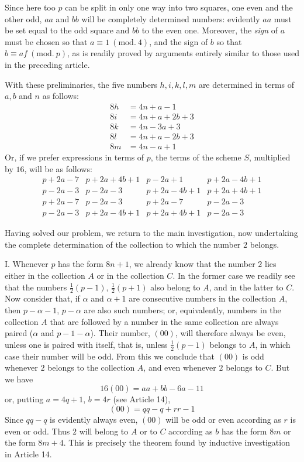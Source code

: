 Since here too $p$ can be split in only one way into two squares, one even and the other odd, $aa$ and $bb$ will be completely determined numbers: evidently $aa$ must be set equal to the odd square and $bb$ to the even one. Moreover, the \emph{sign} of $a$ must be chosen so that $a\equiv1\ (\mathrm{mod.}\ 4)$, and the sign of $b$ so that $b\equiv af\ (\mathrm{mod.}\ p)$, as is readily proved by arguments entirely similar to those used in the preceding article.

With these preliminaries, the five numbers $h,i,k,l,m$ are determined in terms of $a,b$ and $n$ as follows:
\[
\begin{aligned}
8h&=4n+a-1\\
8i&=4n+a+2b+3\\
8k&=4n-3a+3\\
8l&=4n+a-2b+3\\
8m&=4n-a+1
\end{aligned}
\]
Or, if we prefer expressions in terms of $p$, the terms of the scheme $S$, multiplied by $16$, will be as follows:
\[
\begin{array}{l|l|l|l}
p+2a-7&p+2a+4b+1&p-2a+1&p+2a-4b+1\\
p-2a-3&p-2a-3&p+2a-4b+1&p+2a+4b+1\\
p+2a-7&p-2a-3&p+2a-7&p-2a-3\\
p-2a-3&p+2a-4b+1&p+2a+4b+1&p-2a-3
\end{array}
\]

\clearpage
{}%
Having solved our problem, we return to the main investigation, now undertaking the complete determination of the collection to which the number $2$ belongs.

I. Whenever $p$ has the form $8n+1$, we already know that the number $2$ lies either in the collection $A$ or in the collection $C$. In the former case we readily see that the numbers $\frac12(p-1)$, $\frac12(p+1)$ also belong to $A$, and in the latter to $C$. Now consider that, if $\alpha$ and $\alpha+1$ are consecutive numbers in the collection $A$, then $p-\alpha-1$, $p-\alpha$ are also such numbers; or, equivalently, numbers in the collection $A$ that are followed by a number in the same collection are always paired ($\alpha$ and $p-1-\alpha$). Their number, $(00)$, will therefore always be even, unless one is paired with itself, that is, unless $\frac12(p-1)$ belongs to $A$, in which case their number will be odd. From this we conclude that $(00)$ is odd whenever $2$ belongs to the collection $A$, and even whenever $2$ belongs to $C$. But we have
\[
16(00)=aa+bb-6a-11
\]
or, putting $a=4q+1$, $b=4r$ (see Article 14),
\[
(00)=qq-q+rr-1
\]
Since $qq-q$ is evidently always even, $(00)$ will be odd or even according as $r$ is even or odd. Thus $2$ will belong to $A$ or to $C$ according as $b$ has the form $8m$ or the form $8m+4$. This is precisely the theorem found by inductive investigation in Article 14.

